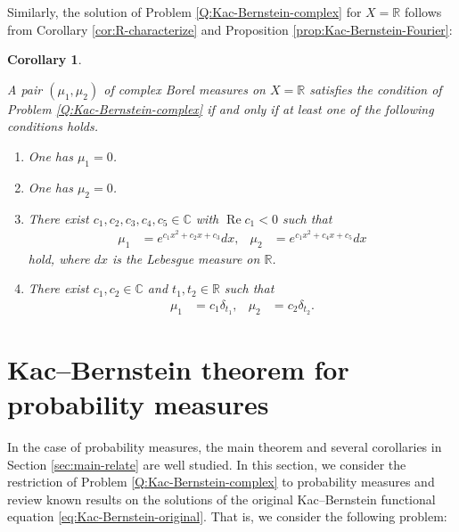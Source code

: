 \documentclass[12pt]{article}
\newtheorem{corollary}[theorem]{Corollary}
\theoremstyle{definition}
\theoremstyle{remark}
\numberwithin{equation}{section}
\numberwithin{figure}{section}
\numberwithin{table}{section}
\DeclareMathOperator{\re}{Re}
\begin{document}
Similarly, the solution of Problem \ref{Q:Kac-Bernstein-complex} for $ X = \mathbb{ R } $ follows from Corollary \ref{cor:R-characterize} and Proposition \ref{prop:Kac-Bernstein-Fourier}:

\begin{corollary}
    \label{cor:Kac-Bernstein-complex-R}

A pair $ ( \mu_1 , \mu_2 ) $ of complex Borel measures on $ X = \mathbb{ R } $ satisfies the condition of Problem \ref{Q:Kac-Bernstein-complex} if and only if at least one of the following conditions holds.

\begin{enumerate}
  \item \label{item:Kac-Bernstein-complex-R-f1-zero}
  
  One has $ \mu_1 = 0 $.

  \item \label{item:Kac-Bernstein-complex-R-f2-zero}
  
  One has $ \mu_2 = 0 $.

\item \label{item:Kac-Bernstein-complex-R-Gauss}

There exist $ c_1 , c_2 , c_3 , c_4 , c_5 \in \mathbb{ C } $ with $ \re c_1 < 0 $ such that
\begin{align}
  \mu_1 & = e^{ c_1 x^2 + c_2 x + c_3 } dx, &
  \mu_2 & = e^{ c_1 x^2 + c_4 x + c_5 } dx
\end{align}
hold, where $ dx $ is the Lebesgue measure on $ \mathbb{ R } $.

\item \label{item:Kac-Bernstein-complex-R-degenerate}

There exist $ c_1 , c_2 \in \mathbb{ C } $ and $ t_1 , t_2 \in \mathbb{ R } $ such that
\begin{align}
  \mu_1 & = c_1 \delta_{ t_1 }, &
  \mu_2 & = c_2 \delta_{ t_2 }.
\end{align}

\end{enumerate}
    
\end{corollary}

\section{Kac--Bernstein theorem for probability measures}
\label{sec:Kac-Bernstein-probability}

In the case of probability measures, the main theorem and several corollaries in Section \ref{sec:main-relate} are well studied.
In this section, we consider the restriction of Problem \ref{Q:Kac-Bernstein-complex} to probability measures and review known results on the solutions of the original Kac--Bernstein functional equation \eqref{eq:Kac-Bernstein-original}.
That is, we consider the following problem:
\end{document}
